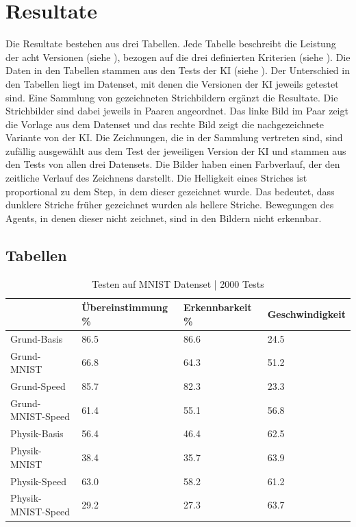 \chapter{Resultate}
\label{chap:r}
Die Resultate bestehen aus drei Tabellen. Jede Tabelle beschreibt die Leistung
der acht Versionen (siehe ), bezogen auf die drei
definierten Kriterien (siehe ). Die Daten in den Tabellen
stammen aus den Tests der KI (siehe ). Der Unterschied
in den Tabellen liegt im Datenset, mit denen die Versionen der KI jeweils
getestet sind. Eine Sammlung von gezeichneten Strichbildern ergänzt die
Resultate. Die Strichbilder sind dabei jeweils in Paaren angeordnet. Das linke
Bild im Paar zeigt die Vorlage aus dem Datenset und das rechte Bild zeigt die
nachgezeichnete Variante von der KI. Die Zeichnungen, die in der Sammlung
vertreten sind, sind zufällig ausgewählt aus dem Test der jeweiligen Version der
KI und stammen aus den Tests von allen drei Datensets. Die Bilder haben einen
Farbverlauf, der den zeitliche Verlauf des Zeichnens darstellt. Die Helligkeit
eines Striches ist proportional zu dem Step, in dem dieser gezeichnet wurde. Das
bedeutet, dass dunklere Striche früher gezeichnet wurden als hellere Striche.
Bewegungen des Agents, in denen dieser nicht zeichnet, sind in den Bildern nicht
erkennbar.

\newpage
\section{Tabellen}
\label{chap:r_tab}
\begin{table}[!ht]
    \centering
    \caption{Testen auf MNIST Datenset | 2000 Tests}
    \begin{tabular}{|l|l|l|l|}
        \hline
            ~ & Übereinstimmung \% & Erkennbarkeit \% & Geschwindigkeit \\ \hline
            Grund-Basis & 86.5 & 86.6 & 24.5 \\ \hline
            Grund-MNIST & 66.8 & 64.3 & 51.2 \\ \hline
            Grund-Speed & 85.7 & 82.3 & 23.3 \\ \hline
            Grund-MNIST-Speed & 61.4 & 55.1 & 56.8 \\ \hline
            Physik-Basis & 56.4 & 46.4 & 62.5 \\ \hline
            Physik-MNIST & 38.4 & 35.7 & 63.9 \\ \hline
            Physik-Speed & 63.0 & 58.2 & 61.2 \\ \hline
            Physik-MNIST-Speed & 29.2 & 27.3 & 63.7 \\ \hline
        \end{tabular}
    \label{tab:MNIST}
\end{table}

